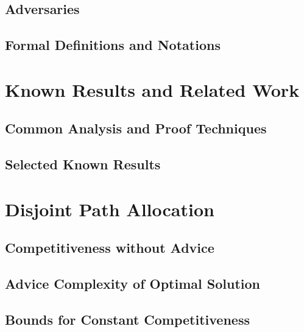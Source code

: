 \documentclass[12pt,a4paper]{report}
\begin{document}
\section{Adversaries}
\label{section:online-graph}

\section{Formal Definitions and Notations}
\label{section:definitions}


\chapter{Known Results and Related Work}
\label{chapter:known}

\section{Common Analysis and Proof Techniques}
\label{section:techniques}

\section{Selected Known Results}
\label{section:known-results}


\chapter{Disjoint Path Allocation}
\label{chapter:dpa}

\section{Competitiveness without Advice}
\label{section:dpa-no-advice}

\section{Advice Complexity of Optimal Solution}
\label{section:dpa-optimal}

%
\section{Bounds for Constant Competitiveness}
\label{section:dpa-constant-compet}

\end{document}
